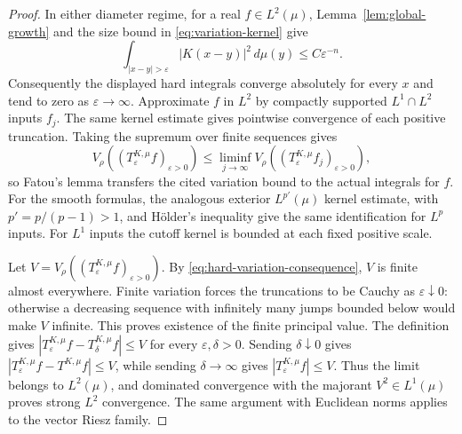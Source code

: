 \begin{proof}
In either diameter regime, for a real $f\in L^2(\mu)$,
Lemma~\ref{lem:global-growth} and the size bound in
\eqref{eq:variation-kernel} give
\[
 \int_{|x-y|>\varepsilon}|K(x-y)|^2\,d\mu(y)
 \le C\varepsilon^{-n}.
\]
Consequently the displayed hard integrals converge absolutely for
every $x$ and tend to zero as $\varepsilon\to\infty$.
Approximate $f$ in $L^2$ by compactly supported $L^1\cap L^2$ inputs
$f_j$. The same kernel estimate gives pointwise convergence of each
positive truncation. Taking the supremum over finite sequences gives
\[
 V_\rho((T^{K,\mu}_\varepsilon f)_{\varepsilon>0})
 \le\liminf_{j\to\infty}
 V_\rho((T^{K,\mu}_\varepsilon f_j)_{\varepsilon>0}),
\]
so Fatou's lemma transfers the cited variation bound to the actual
integrals for $f$. For the smooth formulas, the analogous exterior
$L^{p'}(\mu)$ kernel estimate, with $p'=p/(p-1)>1$, and H\"older's
inequality give the same identification for $L^p$ inputs. For $L^1$
inputs the cutoff kernel is bounded at each fixed positive scale.

Let $V=V_\rho((T^{K,\mu}_\varepsilon f)_{\varepsilon>0})$. By
\eqref{eq:hard-variation-consequence}, $V$ is finite almost everywhere.
Finite variation forces the truncations to be Cauchy as
$\varepsilon\downarrow0$: otherwise a decreasing sequence with
infinitely many jumps bounded below would make $V$ infinite.
This proves existence of the finite principal value. The definition
gives $|T^{K,\mu}_\varepsilon f-T^{K,\mu}_\delta f|\le V$ for every
$\varepsilon,\delta>0$. Sending $\delta\downarrow0$ gives
$|T^{K,\mu}_\varepsilon f-T^{K,\mu}f|\le V$, while sending
$\delta\to\infty$ gives $|T^{K,\mu}_\varepsilon f|\le V$.
Thus the limit belongs to $L^2(\mu)$, and dominated convergence with
the majorant $V^2\in L^1(\mu)$ proves strong $L^2$ convergence.
The same argument with Euclidean norms applies to the vector Riesz
family.
\end{proof}
